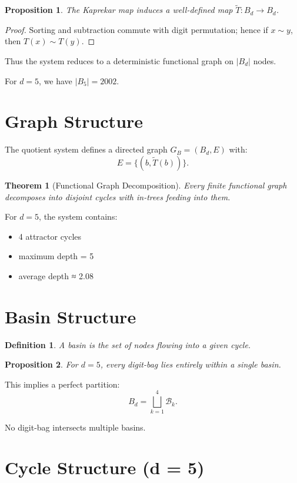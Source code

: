 \documentclass[11pt]{article}
\newtheorem{theorem}{Theorem}
\newtheorem{definition}{Definition}
\newtheorem{proposition}{Proposition}
\begin{document}
\begin{proposition}
The Kaprekar map induces a well-defined map $\tilde{T}: B_d \to B_d$.
\end{proposition}

\begin{proof}
Sorting and subtraction commute with digit permutation; hence if $x \sim y$, then $T(x) \sim T(y)$.
\end{proof}

Thus the system reduces to a deterministic functional graph on $|B_d|$ nodes.

For $d=5$, we have $|B_5| = 2002$.

\section{Graph Structure}

The quotient system defines a directed graph $G_B = (B_d, E)$ with:
\[
E = \{(b, \tilde{T}(b))\}.
\]

\begin{theorem}[Functional Graph Decomposition]
Every finite functional graph decomposes into disjoint cycles with in-trees feeding into them.
\end{theorem}

For $d=5$, the system contains:
\begin{itemize}
\item 4 attractor cycles
\item maximum depth = 5
\item average depth ≈ 2.08
\end{itemize}

\section{Basin Structure}

\begin{definition}
A basin is the set of nodes flowing into a given cycle.
\end{definition}

\begin{proposition}
For $d=5$, every digit-bag lies entirely within a single basin.
\end{proposition}

This implies a perfect partition:
\[
B_d = \bigsqcup_{k=1}^4 \mathcal{B}_k.
\]

No digit-bag intersects multiple basins.

\section{Cycle Structure (d = 5)}
\end{document}
